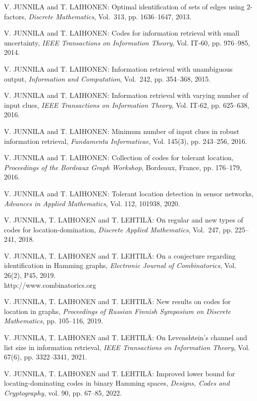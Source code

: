 \begin{thebibliography}{999}
V. JUNNILA and T. LAIHONEN: Optimal identification of sets of edges using $2$-factors, {\it Discrete Mathematics}, Vol.~313, pp. 1636--1647, 2013.

V. JUNNILA and T. LAIHONEN: Codes for information retrieval with small uncertainty, {\it IEEE Transactions on Information Theory}, Vol. IT-60, pp. 976--985, 2014.

  V. JUNNILA and T. LAIHONEN: Information retrieval with unambiguous output, {\it Information and Computation}, Vol.~242, pp. 354--368, 2015.

V. JUNNILA and T. LAIHONEN: Information retrieval with varying number of input clues, {\it IEEE Transactions on Information Theory}, Vol. IT-62, pp. 625--638, 2016.  

V. JUNNILA and T. LAIHONEN: Minimum number of input clues in robust information retrieval, {\it Fundamenta Informaticae}, Vol. 145(3), pp. 243--256, 2016.

V. JUNNILA and T. LAIHONEN: Collection of codes for tolerant location, {\it Proceedings of the Bordeaux Graph Workshop}, Bordeaux, France, pp. 176--179, 2016.

V. JUNNILA and T. LAIHONEN: Tolerant location detection in sensor networks, {\it Advances in Applied Mathematics}, Vol. 112, 101938, 2020.

V. JUNNILA, T. LAIHONEN and T. LEHTIL\"A: On regular and new types of codes for location-domination, {\it Discrete Applied Mathematics}, Vol.~247, pp. 225--241, 2018.

V. JUNNILA, T. LAIHONEN and T. LEHTIL\"A: On a conjecture regarding identification in Hamming graphs, {\it Electronic Journal of Combinatorics}, Vol. 26(2), P45, 2019.\\
http://www.combinatorics.org

V. JUNNILA, T. LAIHONEN and T. LEHTIL\"A: New results on codes for location in graphs, {\it Proceedings of Russian Finnish Symposium on Discrete Mathematics}, pp. 105--116, 2019.

V. JUNNILA, T. LAIHONEN and T. LEHTIL\"A: On Levenshtein's channel and list size in information retrieval, {\it IEEE Transactions on Information Theory}, Vol. 67(6), pp. 3322--3341, 2021.

V. JUNNILA, T. LAIHONEN and T. LEHTIL\"A: Improved lower bound for locating-dominating codes in binary Hamming spaces, {\it Designs, Codes and Cryptography}, vol. 90, pp. 67--85, 2022.


\end{thebibliography}
